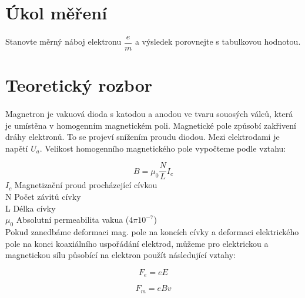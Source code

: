 \documentclass{praktikum}
\begin{document}
\maketitle
\vspace{0.5 cm}


\section{Úkol měření}
\paragraph{}Stanovte měrný náboj elektronu $\dfrac{e}{m}$ a výsledek porovnejte s tabulkovou hodnotou.
\section{Teoretický rozbor}
\paragraph{}
Magnetron je vakuová dioda s katodou a anodou ve tvaru souosých válců, která je umístěna v homogenním magnetickém poli. Magnetické pole způsobí zakřivení dráhy elektronů. To se projeví snížením proudu diodou. Mezi elektrodami je napětí $U_a$. Velikost homogenního magnetického pole vypočteme podle vztahu:

\begin{equation}
\label{eqn:mag_pole_civkou}
B = \mu _0 \frac{N}{L}I_c
\end{equation}$I_c$ \dotfill Magnetizační proud procházející cívkou\\
N \dotfill Počet závitů cívky \\
L \dotfill Délka cívky \\
$\mu _0$ \dotfill Absolutní permeabilita vakua ($4\pi 10^{-7}$) \\

Pokud zanedbáme deformaci mag. pole na koncích cívky a deformaci elektrického pole na konci koaxiálního uspořádání elektrod, můžeme pro elektrickou a magnetickou sílu působící na elektron použít následující vztahy:

\begin{equation}
\label{eqn:sila_elektrickeho_pole}
F_e = eE
\end{equation}

\begin{equation}
\label{eqn:sila_magnetickeho_pole}
F_m = eBv
\end{equation}
\end{document}

